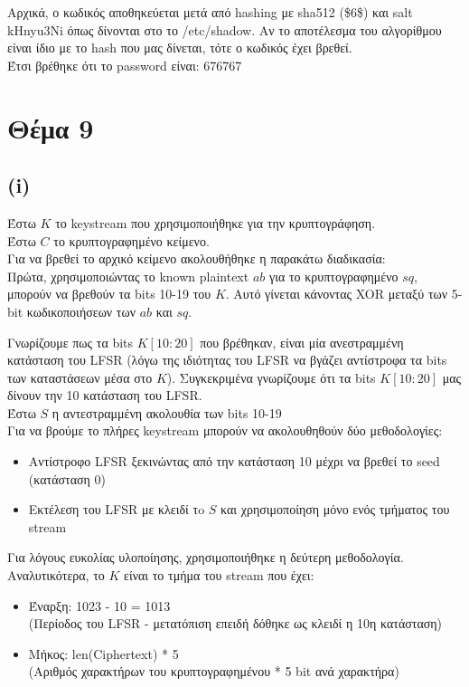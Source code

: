 \documentclass[a4paper, 11pt]{article}
\newcommand{\lt}{\latintext}
\begin{document}
Αρχικά, ο κωδικός αποθηκεύεται μετά από {\lt hashing} με {\lt sha512} (\$6\$) και {\lt salt} {\lt kHnyu3Ni} όπως δίνονται στο το {\lt /etc/shadow}. Αν το αποτέλεσμα του αλγορίθμου είναι ίδιο με το {\lt hash} που μας δίνεται, τότε ο κωδικός έχει βρεθεί.\\

Έτσι βρέθηκε ότι το {\lt password} είναι: 676767



\newpage


\section*{Θέμα 9}
\subsection*{{\lt (i)}}
Έστω $K$ το {\lt keystream} που χρησιμοποιήθηκε για την κρυπτογράφηση.\\
Έστω $C$ το κρυπτογραφημένο κείμενο.\\
Για να βρεθεί το αρχικό κείμενο ακολουθήθηκε η παρακάτω διαδικασία:\\

Πρώτα, χρησιμοποιώντας το {\lt known plaintext} $ab$ για το κρυπτογραφημένο $sq$, μπορούν να βρεθούν τα {\lt bits} 10-19 του $Κ$.
Αυτό γίνεται κάνοντας {\lt XOR} μεταξύ των 5-{\lt bit} κωδικοποιήσεων των $ab$ και $sq$.

Γνωρίζουμε πως τα {\lt bits} $Κ[10:20]$ που βρέθηκαν, είναι μία ανεστραμμένη κατάσταση του {\lt LFSR} (λόγω της ιδιότητας του {\lt LFSR} να βγάζει
αντίστροφα τα {\lt bits} των καταστάσεων μέσα στο $K$). Συγκεκριμένα γνωρίζουμε ότι τα {\lt bits} $Κ[10:20]$ μας δίνουν την 10 κατάσταση του {\lt LFSR}.\\

\noindent Έστω $S$ η αντεστραμμένη ακολουθία των {\lt bits} 10-19\\

Για να βρούμε το πλήρες {\lt keystream} μπορούν να ακολουθηθούν δύο μεθοδολογίες:

\begin{itemize}
\item Αντίστροφο {\lt LFSR} ξεκινώντας από την κατάσταση 10 μέχρι να βρεθεί το {\lt seed} (κατάσταση 0)
\item Εκτέλεση του {\lt LFSR} με κλειδί τo $S$ και χρησιμοποίηση μόνο ενός τμήματος του {\lt stream}
\end{itemize}

Για λόγους ευκολίας υλοποίησης, χρησιμοποιήθηκε η δεύτερη μεθοδολογία. Αναλυτικότερα, το $Κ$ είναι το τμήμα του {\lt stream} που έχει:\\
\begin{itemize}
\item Έναρξη: 1023 - 10 = 1013 \\(Περίοδος του {\lt LFSR} - μετατόπιση επειδή δόθηκε ως κλειδί η 10η κατάσταση)\\
\item Μήκος: {\lt len(Ciphertext)} * 5 \\(Αριθμός χαρακτήρων του κρυπτογραφημένου * 5 {\lt bit} ανά χαρακτήρα)\\
\end{itemize}
\end{document}
